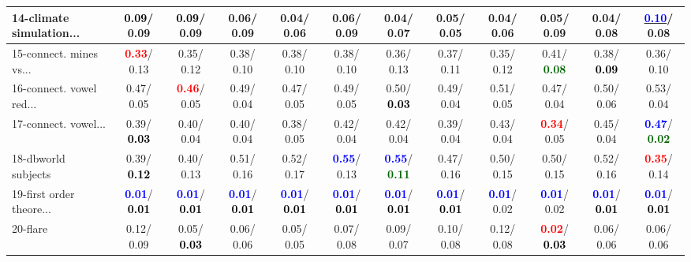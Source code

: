 \begin{table}[h]
\begin{center}
{\begin{tabular}{lc|c|c|c|c|c|c|c|c|c|c}
14-climate simulation... & \textcolor{black}{\textbf{  0.09}}/  0.09 & \textcolor{black}{\textbf{  0.09}}/  0.09 &   0.06/  0.09 &   0.04/  0.06 &   0.06/  0.09 &   0.04/  0.07 &   0.05/  0.05 &   0.04/  0.06 &   0.05/  0.09 &   0.04/  0.08 & \underline{\textcolor{blue}{\textbf{  0.10}}}/  0.08 \\ \hline
15-connect. mines vs... & \textcolor{red}{\textbf{  0.33}}/  0.13 &   0.35/  0.12 &   0.38/  0.10 &   0.38/  0.10 &   0.38/  0.10 &   0.36/  0.13 &   0.37/  0.11 &   0.35/  0.12 &   0.41/\textcolor{darkgreen}{\textbf{  0.08}} &   0.38/\textcolor{black}{\textbf{  0.09}} &   0.36/  0.10 \\
16-connect. vowel red... &   0.47/  0.05 & \textcolor{red}{\textbf{  0.46}}/  0.05 &   0.49/  0.04 &   0.47/  0.05 &   0.49/  0.05 &   0.50/\textcolor{black}{\textbf{  0.03}} &   0.49/  0.04 &   0.51/  0.05 &   0.47/  0.04 &   0.50/  0.06 &   0.53/  0.04 \\
17-connect. vowel... &   0.39/\textcolor{black}{\textbf{  0.03}} &   0.40/  0.04 &   0.40/  0.04 &   0.38/  0.05 &   0.42/  0.04 &   0.42/  0.04 &   0.39/  0.04 &   0.43/  0.04 & \textcolor{red}{\textbf{  0.34}}/  0.05 &   0.45/  0.04 & \textcolor{blue}{\textbf{  0.47}}/\textcolor{darkgreen}{\textbf{  0.02}} \\
18-dbworld subjects &   0.39/\textcolor{black}{\textbf{  0.12}} &   0.40/  0.13 &   0.51/  0.16 &   0.52/  0.17 & \textcolor{blue}{\textbf{  0.55}}/  0.13 & \textcolor{blue}{\textbf{  0.55}}/\textcolor{darkgreen}{\textbf{  0.11}} &   0.47/  0.16 &   0.50/  0.15 &   0.50/  0.15 &   0.52/  0.16 & \textcolor{red}{\textbf{  0.35}}/  0.14 \\
19-first order theore... & \textcolor{blue}{\textbf{  0.01}}/\textcolor{black}{\textbf{  0.01}} & \textcolor{blue}{\textbf{  0.01}}/\textcolor{black}{\textbf{  0.01}} & \textcolor{blue}{\textbf{  0.01}}/\textcolor{black}{\textbf{  0.01}} & \textcolor{blue}{\textbf{  0.01}}/\textcolor{black}{\textbf{  0.01}} & \textcolor{blue}{\textbf{  0.01}}/\textcolor{black}{\textbf{  0.01}} & \textcolor{blue}{\textbf{  0.01}}/\textcolor{black}{\textbf{  0.01}} & \textcolor{blue}{\textbf{  0.01}}/\textcolor{black}{\textbf{  0.01}} & \textcolor{blue}{\textbf{  0.01}}/  0.02 & \textcolor{blue}{\textbf{  0.01}}/  0.02 & \textcolor{blue}{\textbf{  0.01}}/\textcolor{black}{\textbf{  0.01}} & \textcolor{blue}{\textbf{  0.01}}/\textcolor{black}{\textbf{  0.01}} \\
20-flare &   0.12/  0.09 &   0.05/\textcolor{black}{\textbf{  0.03}} &   0.06/  0.06 &   0.05/  0.05 &   0.07/  0.08 &   0.09/  0.07 &   0.10/  0.08 &   0.12/  0.08 & \textcolor{red}{\textbf{  0.02}}/\textcolor{black}{\textbf{  0.03}} &   0.06/  0.06 &   0.06/  0.06 \\

\end{tabular}}
\end{center}
\end{table}
